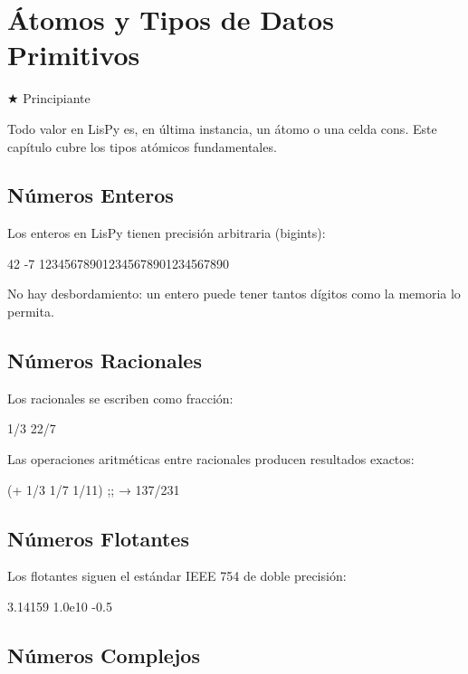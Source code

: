 \chapter{Átomos y Tipos de Datos Primitivos}
\label{chap:atoms}

{\huge$\bigstar$} Principiante

Todo valor en LisPy es, en última instancia, un átomo o una celda cons. Este
capítulo cubre los tipos atómicos fundamentales.

\section{Números Enteros}

Los enteros en LisPy tienen precisión arbitraria (bigints):

\begin{lispcode}
42
-7
123456789012345678901234567890
\end{lispcode}

No hay desbordamiento: un entero puede tener tantos dígitos como la memoria
lo permita.

\section{Números Racionales}

Los racionales se escriben como fracción:

\begin{lispcode}
1/3
22/7
\end{lispcode}

Las operaciones aritméticas entre racionales producen resultados exactos:

\begin{lispcode}
(+ 1/3 1/7 1/11)  ;; → 137/231
\end{lispcode}

\section{Números Flotantes}

Los flotantes siguen el estándar IEEE 754 de doble precisión:

\begin{lispcode}
3.14159
1.0e10
-0.5
\end{lispcode}

\section{Números Complejos}

